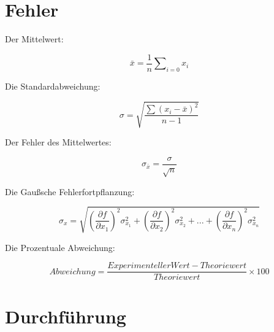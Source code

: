 \documentclass[
  bibliography=totoc,     %
  captions=tableheading,  %
  titlepage=firstiscover, %
]{scrartcl}
\begin{document}
  
  \section{Fehler}
  \label{sec:Fehler}
  Der Mittelwert:
  \begin{center}
    \begin{equation}
      \label{eq:Mittelwert}
    \bar{x} = \frac{1}{n} \sum \nolimits_{i=0} x_i
    \end{equation} 
  \end{center}

  Die Standardabweichung:
  \begin{center}
    \begin{equation}
      \label{eq:standardabweichung}
      \sigma=\sqrt{\frac{\sum(x_i-\bar{x})^2}{n-1}}
    \end{equation}
  \end{center}

  Der Fehler des Mittelwertes:
  \begin{center}
    \begin{equation}
      \label{eq:mittelwertfehler}
      \sigma_{\bar{x}}=\frac{\sigma}{\sqrt{n}}
    \end{equation}

    
  \end{center}

  Die Gaußsche Fehlerfortpflanzung:
  \begin{center}
  \begin{equation}
    \label{eq:gaussfehler}  
  \sigma_x=\sqrt{(\frac{\partial f}{\partial x_1})^2\sigma_{x_1}^2+(\frac{\partial f}{\partial x_2})^2\sigma_{x_2}^2+...+(\frac{\partial f}{\partial x_n})^2\sigma_{x_n}^2}
  \end{equation}
  \end{center}

  Die Prozentuale Abweichung:

  \begin{center}
    \begin{equation}
      \label{eq:prozentuale} 
      Abweichung=\frac{ExperimentellerWert - Theoriewert}{Theoriewert}\times 100 
    \end{equation}
    \end{center}
  
  
  \newpage
  \section{Durchführung}
  \label{sec:Durchführung}
\end{document}

